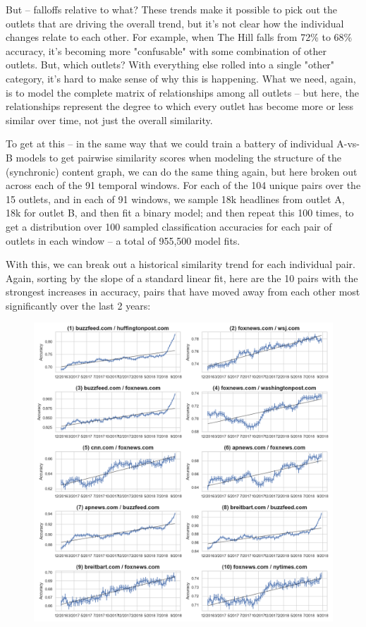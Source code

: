 \documentclass{scrartcl}
\begin{document}
But -- falloffs relative to what? These trends make it possible to pick out the outlets that are driving the overall trend, but it's not clear how the individual changes relate to each other. For example, when The Hill falls from 72\% to 68\% accuracy, it's becoming more "confusable" with some combination of other outlets. But, which outlets? With everything else rolled into a single "other" category, it's hard to make sense of why this is happening. What we need, again, is to model the complete matrix of relationships among all outlets -- but here, the relationships represent the degree to which every outlet has become more or less similar over time, not just the overall similarity.

To get at this -- in the same way that we could train a battery of individual A-vs-B models to get pairwise similarity scores when modeling the structure of the (synchronic) content graph, we can do the same thing again, but here broken out across each of the 91 temporal windows. For each of the 104 unique pairs over the 15 outlets, and in each of 91 windows, we sample 18k headlines from outlet A, 18k for outlet B, and then fit a binary model; and then repeat this 100 times, to get a distribution over 100 sampled classification accuracies for each pair of outlets in each window -- a total of 955,500 model fits.

With this, we can break out a historical similarity trend for each individual pair. Again, sorting by the slope of a standard linear fit, here are the 10 pairs with the strongest increases in accuracy, pairs that have moved away from each other most significantly over the last 2 years:

\begin{figure}[H]
  \centering
  \includegraphics[height=\textheight]{figures/ts-ab-rising.png}
\end{figure}
\end{document}
